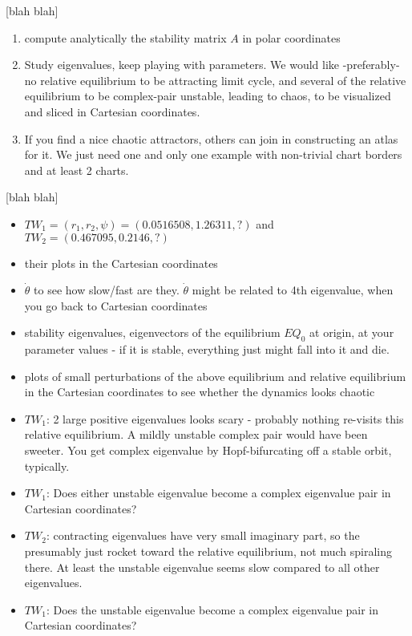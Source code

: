 \documentclass{article}
\begin{document}
 [blah blah]


\begin{enumerate}
  \item
        compute analytically the stability matrix $A$ in polar coordinates
  \item
        Study eigenvalues, keep playing with parameters. We would like
        -preferably- no relative equilibrium to be attracting limit cycle, and several of
        the relative equilibrium to be complex-pair unstable, leading to chaos, to be
        visualized and sliced in Cartesian coordinates.
  \item
        If you find a nice chaotic attractors, others can join in
        constructing an atlas for it. We just need one and only one
        example with non-trivial chart borders and at least 2 charts.
\end{enumerate}

 [blah blah]

\begin{itemize}
  \item $TW_1 = (r_1,r_2,\psi)=(0.0516508, 1.26311,?)$ and
        $TW_2 = (0.467095,0.2146,?)$
  \item their plots in the Cartesian coordinates
  \item $\dot{\theta}$ to see how slow/fast are they. $\dot{\theta}$
        might be related to 4th eigenvalue, when you go back
        to Cartesian coordinates
  \item stability eigenvalues, eigenvectors of the equilibrium $EQ_0$ at
        origin, at your parameter values - if it is stable, everything
        just might fall into it and die.
  \item plots of small perturbations of the above equilibrium and relative equilibrium in
        the Cartesian coordinates to see whether the dynamics looks
        chaotic
  \item $TW_1$: 2 large positive eigenvalues looks scary - probably
        nothing re-visits this relative equilibrium. A mildly unstable complex pair
        would have been sweeter. You get complex eigenvalue by Hopf-bifurcating off a
        stable orbit, typically.
  \item $TW_1$: Does either unstable eigenvalue become a complex
        eigenvalue pair in Cartesian coordinates?
  \item $TW_2$: contracting eigenvalues have very small imaginary
        part, so the presumably just rocket toward the relative equilibrium, not much
        spiraling there. At least the unstable eigenvalue seems slow
        compared to all other eigenvalues.
  \item $TW_1$: Does the unstable eigenvalue become a complex
        eigenvalue pair in Cartesian coordinates?
\end{itemize}
\end{document}
